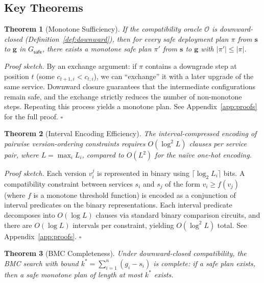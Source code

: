 \documentclass[10pt,twocolumn]{article}
\newtheorem{theorem}{Theorem}
\begin{document}
\subsection{Key Theorems}

\begin{theorem}[Monotone Sufficiency]
\label{thm:monotone}
If the compatibility oracle $\mathcal{O}$ is downward-closed
(Definition~\ref{def:downward}), then for every safe deployment
plan $\pi$ from $\mathbf{s}$ to $\mathbf{g}$ in $G_{\mathsf{safe}}$,
there exists a monotone safe plan $\pi'$ from $\mathbf{s}$ to
$\mathbf{g}$ with $|\pi'| \leq |\pi|$.
\end{theorem}

\emph{Proof sketch.}
By an exchange argument: if $\pi$ contains a downgrade step
at position $t$ (some $c_{t+1,i} < c_{t,i}$), we can
``exchange'' it with a later upgrade of the same service.
Downward closure guarantees that the intermediate configurations
remain safe, and the exchange strictly reduces the number of
non-monotone steps. Repeating this process yields a monotone
plan. See Appendix~\ref{app:proofs} for the full proof.
\hfill$\square$

\begin{theorem}[Interval Encoding Efficiency]
\label{thm:encoding}
The interval-compressed encoding of pairwise version-ordering
constraints requires $O(\log^{2} L)$ clauses per service pair,
where $L = \max_i L_i$, compared to $O(L^{2})$ for the
na\"ive one-hot encoding.
\end{theorem}

\emph{Proof sketch.}
Each version $v_i^j$ is represented in binary using
$\lceil \log_2 L_i \rceil$ bits. A compatibility constraint
between services $s_i$ and $s_j$ of the form
$v_i \geq f(v_j)$ (where $f$ is a monotone threshold function)
is encoded as a conjunction of interval predicates on the
binary representations. Each interval predicate decomposes
into $O(\log L)$ clauses via standard binary comparison
circuits, and there are $O(\log L)$ intervals per constraint,
yielding $O(\log^{2} L)$ total. See Appendix~\ref{app:proofs}.
\hfill$\square$

\begin{theorem}[BMC Completeness]
\label{thm:completeness}
Under downward-closed compatibility, the BMC search with
bound $k^{*} = \sum_{i=1}^{n}(g_i - s_i)$ is complete:
if a safe plan exists, then a safe monotone plan of length
at most $k^{*}$ exists.
\end{theorem}
\end{document}
